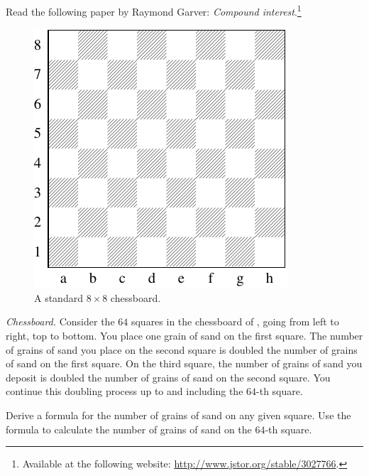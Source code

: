 \documentclass[a4paper,oneside,12pt]{article}
\begin{document}
\begin{problem}
\item Read the following paper by Raymond Garver:
  \emph{Compound interest}.\footnote{
    Available at the following website:
    \url{http://www.jstor.org/stable/3027766}.
  }

\begin{figure}[!htbp]
\centering
\includegraphics[scale=1.1]{image/11/chessboard.pdf}
\caption{%
  A standard $8 \times 8$ chessboard.
}
\label{fig:exponential:chessboard}
\end{figure}

\item\emph{Chessboard.}
  Consider the $64$ squares in the chessboard of
  , going from left to right, top
  to bottom.  You place one grain of sand on the first square.  The
  number of grains of sand you place on the second square is doubled
  the number of grains of sand on the first square.  On the third
  square, the number of grains of sand you deposit is doubled the
  number of grains of sand on the second square.  You continue this
  doubling process up to and including the $64$-th square.
  \begin{packedenum}
  \item\label{subprob:exponential:sand_formula}
    Derive a formula for the number of grains of sand on any given
    square.  Use the formula to calculate the number of grains of sand
    on the $64$-th square.


\end{packedenum}
\end{problem}
\end{document}
